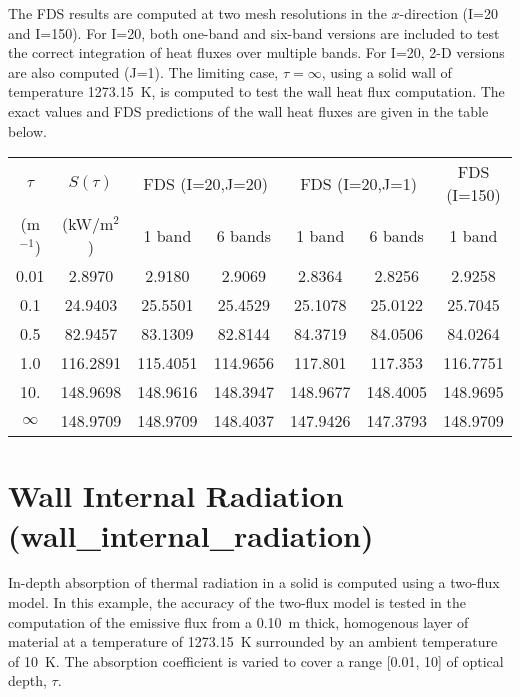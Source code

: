 \documentclass[11pt]{book}
\begin{document}
The FDS results are computed at two mesh resolutions in the $x$-direction (I=20 and I=150). For I=20, both one-band and six-band versions are
included to test the correct integration of heat fluxes over multiple bands. For I=20, 2-D versions are also computed (J=1). The limiting case, $\tau=\infty$,
using a solid wall of temperature 1273.15~K, is computed to test the wall heat flux computation. The exact values and FDS predictions of
the wall heat fluxes are given in the table below.

\begin{center}
\begin{tabular}{|c|c|c|c|c|c|c|} \hline
$\tau$ & $S(\tau)$ & \multicolumn{2}{|c|}{FDS (I=20,J=20)} & \multicolumn{2}{|c|}{FDS (I=20,J=1)} & FDS (I=150) \\ \cline{3-7}
 (m$^{-1}$) & (kW/m$^2$)& 1 band    & 6 bands   & 1 band    & 6 bands  & 1 band \\ \hline\hline
0.01        & 2.8970    & 2.9180    &  2.9069   & 2.8364    & 2.8256   & 2.9258   \\
0.1         & 24.9403   & 25.5501   &  25.4529  & 25.1078   & 25.0122  & 25.7045  \\
0.5         & 82.9457   & 83.1309   &  82.8144  & 84.3719   & 84.0506  & 84.0264  \\
1.0         & 116.2891  & 115.4051  &  114.9656 & 117.801   & 117.353  & 116.7751 \\
10.         & 148.9698  & 148.9616  &  148.3947 & 148.9677  & 148.4005 & 148.9695 \\
$\infty$    & 148.9709  & 148.9709  &  148.4037 & 147.9426  & 147.3793 & 148.9709 \\\hline
\end{tabular}
\end{center}


\clearpage
\section{Wall Internal Radiation (\texorpdfstring{{\bf wall\_internal\_radiation}}{wall\_internal\_radiation}) }
\label{wall_internal_radiation}


In-depth absorption of thermal radiation in a solid is computed using a two-flux model.  In this example, the accuracy of the two-flux model is tested in the
computation of the emissive flux from a 0.10~m thick, homogenous layer of material at a temperature of 1273.15~K surrounded by an ambient temperature of 10~K. The
absorption coefficient is varied to cover a range [0.01, 10] of optical depth, $\tau$.
\end{document}
